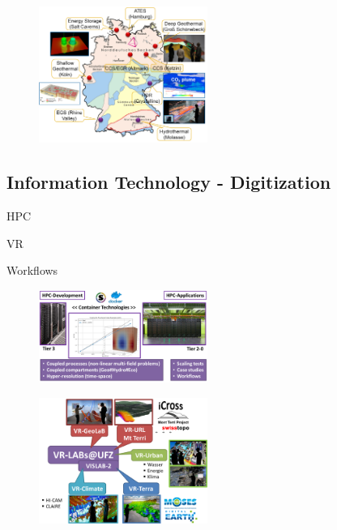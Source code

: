 \begin{figure}
\vspace{-5mm}
\centering
\includegraphics[width=0.49\textwidth]{figures/geoenergy-map}
\caption{}
\label{fig:workflows}
\end{figure}
\lipsum[2]

\clearpage

\subsection*{Information Technology - Digitization}

\begin{list}{-}{\leftmargin=1em \itemindent=0em \itemsep=0em}
\item HPC
\item VR
\item Workflows
\end{list}

\begin{figure}
\vspace{-5mm}
\centering
\includegraphics[width=0.49\textwidth]{figures/hpc-concept1}
\caption{}
\label{fig:workflows}
\end{figure}
\lipsum[2]

\begin{figure}
\vspace{-5mm}
\centering
\includegraphics[width=0.49\textwidth]{figures/vr-labs}
\caption{}
\label{fig:workflows}
\end{figure}
\lipsum[2]

